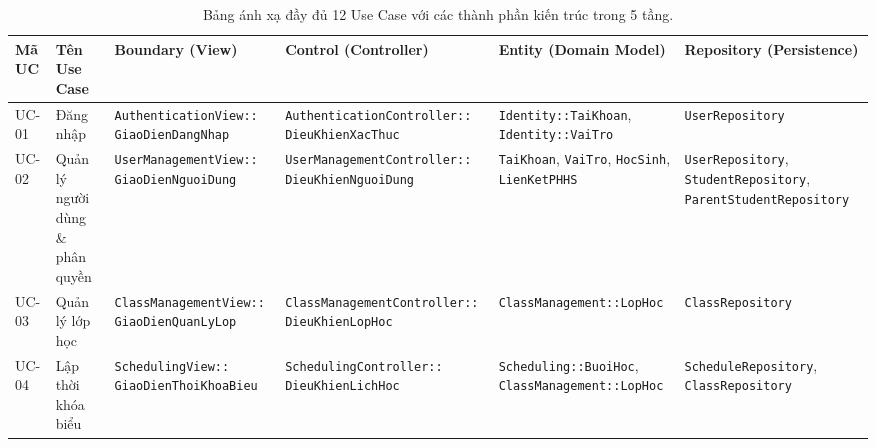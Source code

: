 \clearpage
\begin{landscape}
\begin{table}[p]
  \centering
  \caption{Bảng ánh xạ đầy đủ 12 Use Case với các thành phần kiến trúc trong 5 tầng.}
  \label{tab:uc_mapping}
  \fontsize{7.8pt}{9.6pt}\selectfont
  \renewcommand{\arraystretch}{1.2}
  \begin{tabularx}{\linewidth}{@{}l >{\raggedright\arraybackslash}p{3.2cm} >{\raggedright\arraybackslash}p{4.2cm} >{\raggedright\arraybackslash}p{4.6cm} >{\raggedright\arraybackslash}p{4.8cm} >{\raggedright\arraybackslash}X@{}}
    \toprule
    \textbf{Mã UC} & \textbf{Tên Use Case} & \textbf{Boundary (View)} & \textbf{Control (Controller)} & \textbf{Entity (Domain Model)} & \textbf{Repository (Persistence)} \\
    \midrule
    UC-01 & Đăng nhập & \texttt{AuthenticationView::} \newline \texttt{GiaoDienDangNhap} & \texttt{AuthenticationController::} \newline \texttt{DieuKhienXacThuc} & \texttt{Identity::TaiKhoan}, \newline \texttt{Identity::VaiTro} & \texttt{UserRepository} \\
    UC-02 & Quản lý người dùng \& phân quyền & \texttt{UserManagementView::} \newline \texttt{GiaoDienNguoiDung} & \texttt{UserManagementController::} \newline \texttt{DieuKhienNguoiDung} & \texttt{TaiKhoan}, \texttt{VaiTro}, \newline \texttt{HocSinh}, \texttt{LienKetPHHS} & \texttt{UserRepository}, \newline \texttt{StudentRepository}, \newline \texttt{ParentStudentRepository} \\
    UC-03 & Quản lý lớp học & \texttt{ClassManagementView::} \newline \texttt{GiaoDienQuanLyLop} & \texttt{ClassManagementController::} \newline \texttt{DieuKhienLopHoc} & \texttt{ClassManagement::LopHoc} & \texttt{ClassRepository} \\
    UC-04 & Lập thời khóa biểu & \texttt{SchedulingView::} \newline \texttt{GiaoDienThoiKhoaBieu} & \texttt{SchedulingController::} \newline \texttt{DieuKhienLichHoc} & \texttt{Scheduling::BuoiHoc}, \newline \texttt{ClassManagement::LopHoc} & \texttt{ScheduleRepository}, \newline \texttt{ClassRepository} \\

\end{tabularx}
\end{table}
\end{landscape}
